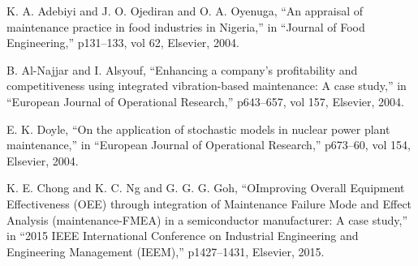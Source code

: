 \documentclass[conference]{IEEEtran}
\begin{document}
\begin{thebibliography}{00}
	 K. A. Adebiyi and J. O. Ojediran and O. A. Oyenuga, ``An appraisal of maintenance practice in food industries in Nigeria,'' in ``Journal of Food Engineering,'' p131--133, vol 62, Elsevier, 2004.

	 B. Al-Najjar and I. Alsyouf, ``Enhancing a company's profitability and competitiveness using integrated vibration-based maintenance: A case study,'' in ``European Journal of Operational Research,'' p643--657, vol 157, Elsevier, 2004.

	 E. K. Doyle, ``On the application of stochastic models in nuclear power plant maintenance,'' in ``European Journal of Operational Research,'' p673--60, vol 154, Elsevier, 2004.

	 K. E. Chong and K. C. Ng and G. G. G. Goh, ``OImproving Overall Equipment Effectiveness (OEE) through integration of Maintenance Failure Mode and Effect Analysis (maintenance-FMEA) in a semiconductor manufacturer: A case study,'' in ``2015 IEEE International Conference on Industrial Engineering and Engineering Management (IEEM),'' p1427--1431, Elsevier, 2015.
	
\end{thebibliography}
\end{document}
